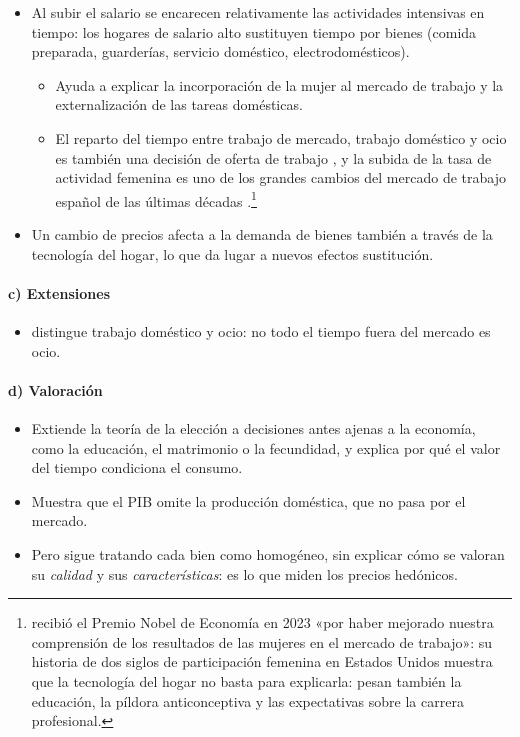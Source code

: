 \documentclass[11pt]{article}
\begin{document}
\begin{itemize}
\item Al subir el salario se encarecen relativamente las actividades intensivas en tiempo: los hogares de salario alto sustituyen tiempo por bienes (comida preparada, guarderías, servicio doméstico, electrodomésticos).
  \begin{itemize}
  \item Ayuda a explicar la incorporación de la mujer al mercado de trabajo y la externalización de las tareas domésticas.
  \item El reparto del tiempo entre trabajo de mercado, trabajo doméstico y ocio es también una decisión de oferta de trabajo , y la subida de la tasa de actividad femenina es uno de los grandes cambios del mercado de trabajo español de las últimas décadas .\footnote{ recibió el Premio Nobel de Economía en 2023 «por haber mejorado nuestra comprensión de los resultados de las mujeres en el mercado de trabajo»\nocite{Nobel2023Goldin}: su historia de dos siglos de participación femenina en Estados Unidos muestra que la tecnología del hogar no basta para explicarla: pesan también la educación, la píldora anticonceptiva y las expectativas sobre la carrera profesional.}
  \end{itemize}
\item Un cambio de precios afecta a la demanda de bienes también a través de la tecnología del hogar, lo que da lugar a nuevos efectos sustitución.
\end{itemize}

\paragraph{c) Extensiones}

\begin{itemize}
\item \textcite{Gronau1977Leisure} distingue trabajo doméstico y ocio: no todo el tiempo fuera del mercado es ocio.
\end{itemize}

\paragraph{d) Valoración}

\begin{itemize}
\item Extiende la teoría de la elección a decisiones antes ajenas a la economía, como la educación, el matrimonio o la fecundidad, y explica por qué el valor del tiempo condiciona el consumo.
\item Muestra que el PIB omite la producción doméstica, que no pasa por el mercado.
\item Pero sigue tratando cada bien como homogéneo, sin explicar cómo se valoran su \emph{calidad} y sus \emph{características}: es lo que miden los precios hedónicos.
\end{itemize}
\end{document}
